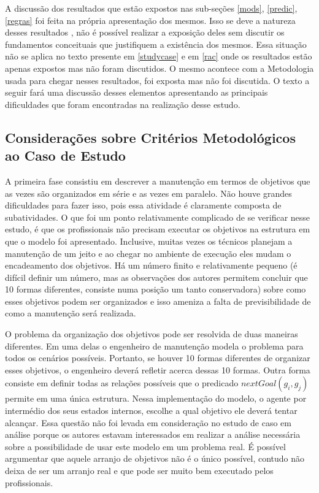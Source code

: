 A discussão dos resultados que estão expostos nas sub-seções \ref{mods}, \ref{predic}, \ref{regras} foi feita na própria apresentação dos mesmos. Isso se deve a natureza desses resultados , não é possível realizar a exposição deles sem discutir os fundamentos conceituais que justifiquem a existência dos mesmos. Essa situação não se aplica no texto presente em \ref{studycase} e em \ref{rac} onde os resultados estão apenas expostos mas não foram discutidos. O mesmo acontece com a Metodologia usada para chegar nesses resultados, foi exposta mas não foi discutida. O texto a seguir fará uma discussão desses elementos apresentando as principais dificuldades que foram encontradas na realização desse estudo. 

\subsection{Considerações sobre Critérios Metodológicos ao Caso de Estudo} \label{conscritmetcasoestudo}

A primeira fase consistiu em descrever a manutenção em termos de objetivos que as vezes são organizados em série e as vezes em paralelo. Não houve grandes dificuldades para fazer isso, pois essa atividade é claramente composta de subatividades. O que foi um ponto relativamente complicado de se verificar nesse estudo, é que os profissionais não precisam executar os objetivos na estrutura em que o modelo foi apresentado. Inclusive, muitas vezes os técnicos planejam a manutenção de um jeito e ao chegar no ambiente de execução eles mudam o encadeamento dos objetivos. Há um número finito e relativamente pequeno (é difícil definir um número, mas as observações dos autores permitem concluir que 10 formas diferentes, consiste numa posição um tanto conservadora) sobre como esses objetivos podem ser organizados e isso ameniza a falta de previsibilidade de como a manutenção será realizada. 

O problema da organização dos objetivos pode ser resolvida de duas maneiras diferentes. Em uma delas o engenheiro de manutenção modela o problema para todos os cenários possíveis. Portanto, se houver 10 formas diferentes de organizar esses objetivos, o engenheiro deverá refletir acerca dessas 10 formas. Outra forma consiste em definir todas as relações possíveis que o predicado $nextGoal(g_i,g_j)$ permite em uma única estrutura. Nessa implementação do modelo, o agente por intermédio dos seus estados internos, escolhe a qual objetivo ele deverá tentar alcançar. Essa questão não foi levada em consideração no estudo de caso em análise porque os autores estavam interessados em realizar a análise necessária sobre a possibilidade de usar este modelo em um problema real. É possível argumentar que aquele arranjo de objetivos não é o único possível, contudo não deixa de ser um arranjo real e que pode ser muito bem executado pelos profissionais. 

